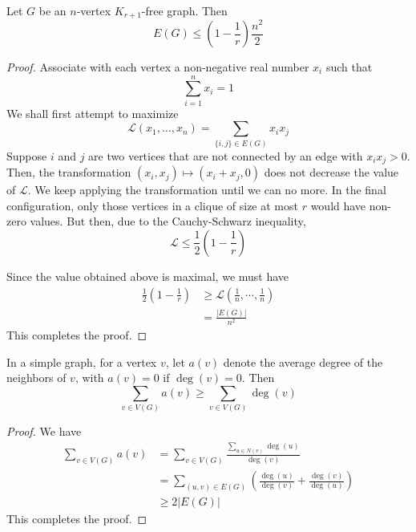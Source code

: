 \begin{theorem}[Tur\'an]
    Let $G$ be an $n$-vertex $K_{r + 1}$-free graph. Then 
    \begin{equation*}
        E(G)\le\left(1 - \frac{1}{r}\right)\frac{n^2}{2}
    \end{equation*}
\end{theorem}
\begin{proof}
    Associate with each vertex a non-negative real number $x_i$ such that 
    \begin{equation*}
        \sum_{i=1}^nx_i = 1
    \end{equation*}
    We shall first attempt to maximize 
    \begin{equation*}
        \mathcal{L}(x_1,\ldots,x_n) = \sum_{\{i,j\}\in E(G)}x_ix_j
    \end{equation*}
    Suppose $i$ and $j$ are two vertices that are not connected by an edge with $x_ix_j > 0$. Then, the transformation $(x_i, x_j)\mapsto(x_i + x_j, 0)$ does not decrease the value of $\mathcal{L}$. We keep applying the transformation until we can no more. In the final configuration, only those vertices in a clique of size at most $r$ would have non-zero values. But then, due to the Cauchy-Schwarz inequality, 
    \begin{equation*}
        \mathcal{L} \le \frac{1}{2}\left(1 - \frac{1}{r}\right)
    \end{equation*}

    Since the value obtained above is maximal, we must have 
    \begin{align*}
        \frac{1}{2}\left(1 - \frac{1}{r}\right)&\ge\mathcal{L}\left(\frac{1}{n},\cdots,\frac{1}{n}\right)\\
        &=\frac{|E(G)|}{n^2}
    \end{align*}
    This completes the proof.
\end{proof}

\begin{proposition}
    In a simple graph, for a vertex $v$, let $a(v)$ denote the average degree of the neighbors of $v$, with $a(v) = 0$ if $\deg(v) = 0$. Then 
    \begin{equation*}
        \sum_{v\in V(G)}a(v)\ge\sum_{v\in V(G)}\deg(v)
    \end{equation*}
\end{proposition}
\begin{proof}
    We have 
    \begin{align*}
        \sum_{v\in V(G)}a(v) &= \sum_{v\in V(G)}\frac{\sum_{u\in N(v)}\deg(u)}{\deg(v)}\\
        &= \sum_{(u,v)\in E(G)}\left(\frac{\deg(u)}{\deg(v)} + \frac{\deg(v)}{\deg(u)}\right)\\
        &\ge 2|E(G)|
    \end{align*}
    This completes the proof.
\end{proof}


